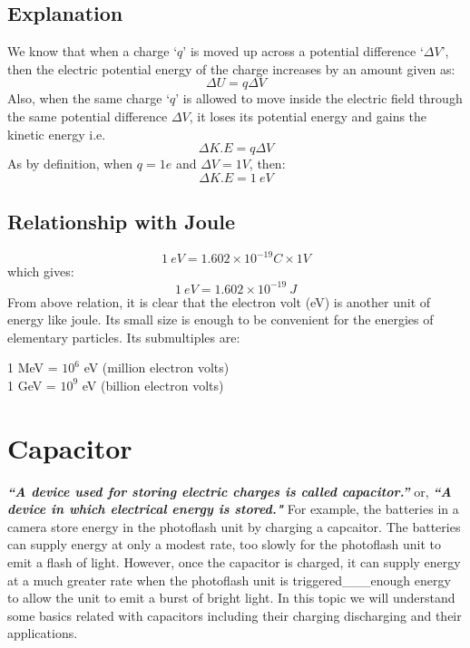 \subsection*{Explanation}
We know that when a charge `$q$' is moved up across a potential difference
`$\Delta V$’, then the electric potential energy of the charge increases
by an amount given as:
\begin{equation}\nonumber
  \Delta U = q\Delta V
\end{equation}
Also, when the same charge `$q$' is allowed to move inside the electric
field through the same potential difference $\Delta V$,
it loses its potential energy and gains the kinetic energy i.e.
\begin{equation}\nonumber
  \Delta K.E = q\Delta V
\end{equation}
As by definition, when $q = 1e$ and $\Delta V = 1 V$, then:
\begin{equation}\nonumber
  \Delta K.E = 1\:eV
\end{equation}
\subsection*{Relationship with Joule}
\begin{equation}\nonumber
  1\:eV = 1.602\times 10^{-19}C \times 1 V
\end{equation}
which gives:
\begin{equation}\nonumber
  1\:eV = 1.602\times 10^{-19}\:J
\end{equation}
From above relation, it is clear that the electron volt (eV) is another
unit of energy like joule. Its small size is enough to be convenient for the energies of elementary particles.
Its submultiples are:
\begin{center}
1 MeV = $10^{6}$ eV (million electron volts)\\
1 GeV = $10^{9}$ eV (billion electron volts)
\end{center}
\section{Capacitor}
\textit{\textbf{``A device used for storing electric charges is called capacitor.”}}
or, \textit{\textbf{“A device in which electrical energy is stored."}}
For example, the batteries in a camera store energy in the photoflash
unit by charging a capcaitor. The batteries can supply energy at only a
modest rate, too slowly for the photoflash unit to emit a flash of light.
However, once the capacitor is charged, it can supply energy at a much
greater rate when the photoflash unit is triggered\_\_\_enough energy to
allow the unit to emit a burst of bright light. In this topic we
will understand some basics related with capacitors
including their charging discharging and their applications.

